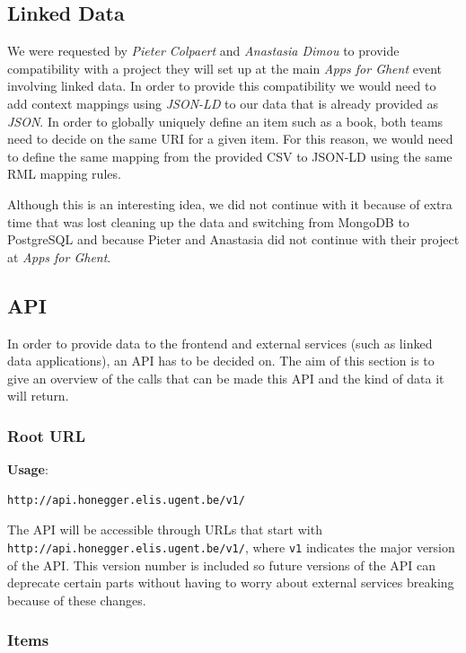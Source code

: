 \subsection{Linked Data}

We were requested by \emph{Pieter Colpaert} and \emph{Anastasia Dimou} to provide compatibility with a project they will set up at the main \emph{Apps for Ghent} event involving linked data. In order to provide this compatibility we would need to add context mappings using \emph{JSON-LD} to our data that is already provided as \emph{JSON}. In order to globally uniquely define an item such as a book, both teams need to decide on the same URI for a given item. For this reason, we would need to define the same mapping from the provided CSV to JSON-LD using the same RML mapping rules.

Although this is an interesting idea, we did not continue with it because of extra time that was lost cleaning up the data and switching from MongoDB to PostgreSQL and because Pieter and Anastasia did not continue with their project at \emph{Apps for Ghent}.

\subsection{API}

In order to provide data to the frontend and external services (such as linked data applications), an API has to be decided on. The aim of this section is to give an overview of the calls that can be made this API and the kind of data it will return.

\subsubsection{Root URL}

{\bf Usage}:
\begin{verbatim}
http://api.honegger.elis.ugent.be/v1/
\end{verbatim}

The API will be accessible through URLs that start with \texttt{http://api.honegger.elis.ugent.be/v1/}, where \texttt{v1} indicates the major version of the API. This version number is included so future versions of the API can deprecate certain parts without having to worry about external services breaking because of these changes.

\subsubsection{Items}


